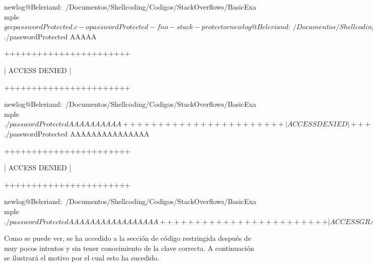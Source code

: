 \documentclass [titlepage, 12pt]{article}
\begin{document}
\begin{listing}[style=consola, numbers=none, caption=Stack overflow en el ejecutable passwordProtected]	
newlog@Beleriand:~/Documentos/Shellcoding/Codigos/StackOverflows/BasicExample$ gcc passwordProtected.c -o passwordProtected -fno-stack-protector
newlog@Beleriand:~/Documentos/Shellcoding/Codigos/StackOverflows/BasicExample$ ./passwordProtected AAAAA

+++++++++++++++++++++++

|    ACCESS DENIED    |

+++++++++++++++++++++++

newlog@Beleriand:~/Documentos/Shellcoding/Codigos/StackOverflows/BasicExample$ ./passwordProtected AAAAAAAAAA

+++++++++++++++++++++++

|    ACCESS DENIED    |

+++++++++++++++++++++++

newlog@Beleriand:~/Documentos/Shellcoding/Codigos/StackOverflows/BasicExample$ ./passwordProtected AAAAAAAAAAAAAAA

+++++++++++++++++++++++

|    ACCESS DENIED    |

+++++++++++++++++++++++

newlog@Beleriand:~/Documentos/Shellcoding/Codigos/StackOverflows/BasicExample$ ./passwordProtected AAAAAAAAAAAAAAAAA

++++++++++++++++++++++++

|    ACCESS GRANTED    |

++++++++++++++++++++++++

newlog@Beleriand:~/Documentos/Shellcoding/Codigos/StackOverflows/BasicExample$ 
\end{listing}

Como se puede ver, se ha accedido a la secci\'on de c\'odigo restringida despu\'es de muy pocos intentos y sin tener conocimiento de la clave correcta. A continuaci\'on se ilustrar\'a el motivo por el cual esto ha sucedido.\\
\end{document}
